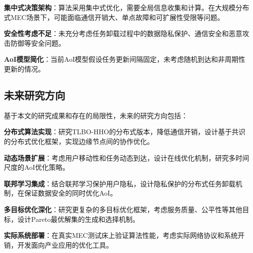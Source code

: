 \documentclass[conference]{IEEEtran}
\begin{document}
\textbf{集中式决策架构}：算法采用集中式优化，需要全局信息收集和计算。在大规模分布式MEC场景下，可能面临通信开销大、单点故障和可扩展性受限等问题。

\textbf{安全性考虑不足}：未充分考虑任务卸载过程中的数据隐私保护、通信安全和恶意攻击防御等安全问题。

\textbf{AoI模型简化}：当前AoI模型假设任务更新间隔固定，未考虑随机到达和非周期性更新的情况。

\subsection{未来研究方向}
基于本文的研究成果和存在的局限性，未来的研究方向包括：

\textbf{分布式算法实现}：研究TLBO-HHO的分布式版本，降低通信开销，设计基于共识的分布式优化框架，实现边缘节点间的协作优化。

\textbf{动态场景扩展}：考虑用户移动性和任务动态到达，设计在线优化机制，研究多时间尺度的AoI优化策略。

\textbf{联邦学习集成}：结合联邦学习保护用户隐私，设计隐私保护的分布式任务卸载机制，在保证数据安全的同时优化AoI。

\textbf{多目标优化深化}：研究更复杂的多目标优化框架，考虑服务质量、公平性等其他目标，设计Pareto最优解集的生成和选择机制。

\textbf{实际系统部署}：在真实MEC测试床上验证算法性能，考虑实际网络协议和系统开销，开发面向产业应用的优化工具。
\end{document}
